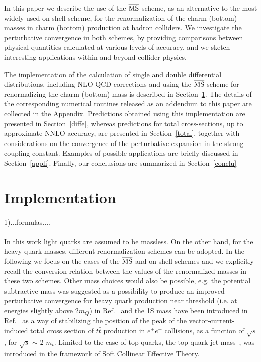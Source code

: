 \documentclass[12pt,a4paper]{article}
\begin{document}
In this paper we describe the use of the $\overline{\rm MS}$ scheme, as an alternative to the most widely used on-shell scheme, for the renormalization of 
the charm (bottom) masses in charm (bottom) production at hadron colliders. 
We investigate the perturbative convergence in both schemes,
by providing comparisons between physical quantities calculated at various levels of accuracy, and we sketch interesting applications within and beyond collider physics.
 
The implementation of the calculation of single and double differential distributions, including NLO QCD corrections and using the $\overline{\rm MS}$ scheme for renormalizing the charm (bottom) mass is described in Section~\ref{imple}. The details of the corresponding numerical routines released as an addendum to this paper are collected in the Appendix. Predictions obtained using this implementation are presented in Section~\ref{diffe}, whereas predictions for total cross-sections, up to approximate NNLO accuracy, are presented in Section~\ref{total}, together with considerations on the convergence of the perturbative expansion in the strong coupling constant.  
Examples of possible applications are briefly discussed in Section~\ref{appli}.
Finally, our conclusions are summarized in Section~\ref{conclu} 


\section{Implementation}
\label{imple}
1)...formulas....\\
\\
In this work light quarks are assumed to be massless. On the other hand, for the heavy-quark masses, different renormalization schemes can be adopted. In the following we focus on the cases of the $\overline{\rm MS}$ and on-shell schemes and we explicitly recall the conversion relation between the values of the renormalized masses in these two schemes. 
Other mass choices would also be possible, e.g. the potential subtractive mass was suggested as a possibility to produce an improved perturbative convergence for heavy quark production near threshold (i.e. at energies slightly above 2$m_Q$) in Ref.~\cite{Beneke:1998rk} and the 1S mass have been introduced in Ref.~\cite{Hoang:1999zc} as a way of stabilizing the position of the peak of the vector-current-induced total cross section of $t\bar{t}$ production in $e^+e^-$ collisions, as a function of $\sqrt{s}$, for $\sqrt{s}$ $\sim$ 2 $m_t$. Limited to the case of top quarks, the top quark jet mass~\cite{Fleming:2007qr}, was introduced in the framework of Soft Collinear Effective Theory.  
\end{document}
